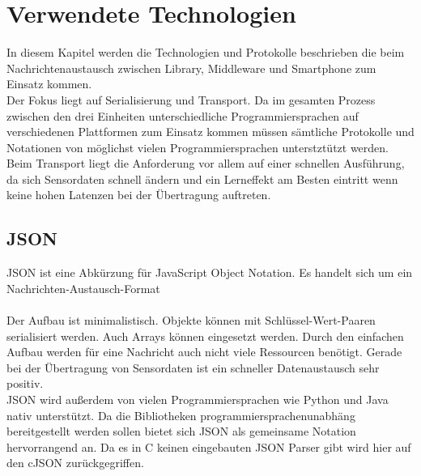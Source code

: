 \documentclass[11pt,a4paper]{report}
\begin{document}
\section*{Verwendete Technologien}
In diesem Kapitel werden die Technologien und Protokolle beschrieben die beim Nachrichtenaustausch zwischen Library, Middleware und Smartphone zum Einsatz kommen.
\\
Der Fokus liegt auf Serialisierung und Transport.
Da im gesamten Prozess zwischen den drei Einheiten unterschiedliche Programmiersprachen auf verschiedenen Plattformen zum Einsatz kommen müssen sämtliche Protokolle und Notationen von möglichst vielen Programmiersprachen unterstztützt werden.
\\
Beim Transport liegt die Anforderung vor allem auf einer schnellen Ausführung, da sich Sensordaten schnell ändern und ein Lerneffekt am Besten eintritt wenn keine hohen Latenzen bei der Übertragung auftreten.

\subsection*{JSON}
JSON ist eine Abkürzung für JavaScript Object Notation.
Es handelt sich um ein Nachrichten-Austausch-Format \cite{json}
\\\\
Der Aufbau ist minimalistisch. Objekte können mit Schlüssel-Wert-Paaren serialisiert werden.
Auch Arrays können eingesetzt werden.
Durch den einfachen Aufbau werden für eine Nachricht auch nicht viele Ressourcen benötigt.
Gerade bei der Übertragung von Sensordaten ist ein schneller Datenaustausch sehr positiv.
\\
JSON wird außerdem von vielen Programmiersprachen wie Python und Java nativ unterstützt.
Da die Bibliotheken programmiersprachenunabhäng bereitgestellt werden sollen bietet sich JSON als gemeinsame Notation hervorrangend an.
Da es in C keinen eingebauten JSON Parser gibt wird hier auf den cJSON \cite{cjson} zurückgegriffen.
\end{document}
